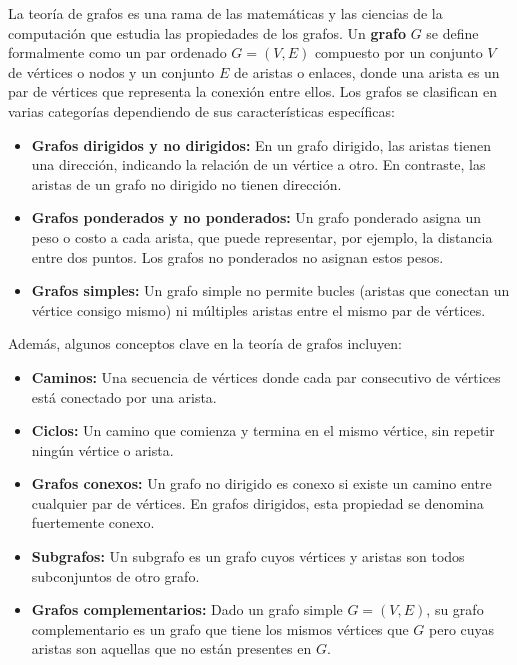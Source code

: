 \documentclass[12pt]{book}
\begin{document}
La teoría de grafos es una rama de las matemáticas y las ciencias de la computación que estudia las propiedades de los grafos. Un \textbf{grafo} $G$ se define formalmente como un par ordenado $G = (V, E)$ compuesto por un conjunto $V$ de vértices o nodos y un conjunto $E$ de aristas o enlaces, donde una arista es un par de vértices que representa la conexión entre ellos. Los grafos se clasifican en varias categorías dependiendo de sus características específicas:

\begin{itemize}
    \item \textbf{Grafos dirigidos y no dirigidos:} En un grafo dirigido, las aristas tienen una dirección, indicando la relación de un vértice a otro. En contraste, las aristas de un grafo no dirigido no tienen dirección.
    \item \textbf{Grafos ponderados y no ponderados:} Un grafo ponderado asigna un peso o costo a cada arista, que puede representar, por ejemplo, la distancia entre dos puntos. Los grafos no ponderados no asignan estos pesos.
    \item \textbf{Grafos simples:} Un grafo simple no permite bucles (aristas que conectan un vértice consigo mismo) ni múltiples aristas entre el mismo par de vértices.
\end{itemize}

Además, algunos conceptos clave en la teoría de grafos incluyen:

\begin{itemize}
    \item \textbf{Caminos:} Una secuencia de vértices donde cada par consecutivo de vértices está conectado por una arista.
    \item \textbf{Ciclos:} Un camino que comienza y termina en el mismo vértice, sin repetir ningún vértice o arista.
    \item \textbf{Grafos conexos:} Un grafo no dirigido es conexo si existe un camino entre cualquier par de vértices. En grafos dirigidos, esta propiedad se denomina fuertemente conexo.
    \item \textbf{Subgrafos:} Un subgrafo es un grafo cuyos vértices y aristas son todos subconjuntos de otro grafo.
    \item \textbf{Grafos complementarios:} Dado un grafo simple $G = (V, E)$, su grafo complementario es un grafo que tiene los mismos vértices que $G$ pero cuyas aristas son aquellas que no están presentes en $G$.
\end{itemize}
\end{document}
